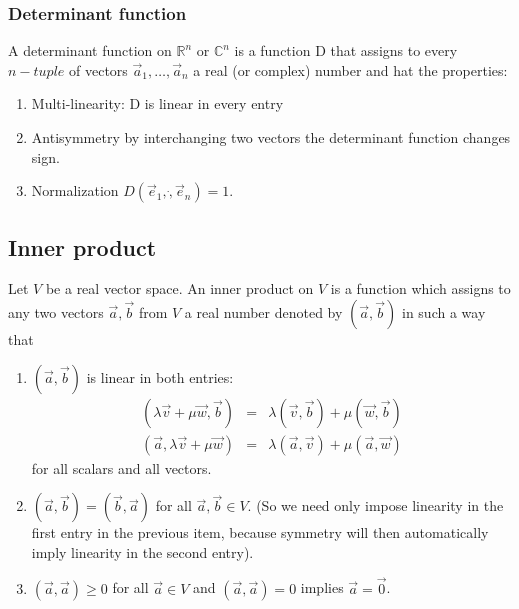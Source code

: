 \documentclass{article}
\begin{document}
			\subsubsection{Determinant function}
			A determinant function on $\mathbb{R}^n$ or $\mathbb{C}^n$ is a function D that assigns to every $n-tuple$ of vectors $\vec{a}_1,\dots,\vec{a}_n$ a real (or complex) number and hat the properties:
			\begin{enumerate}
				\item Multi-linearity: D is linear in every entry
				\item Antisymmetry by interchanging two vectors the determinant function changes sign.
				\item Normalization $D(\vec{e}_1,\dot,\vec{e}_n) = 1$.
			\end{enumerate}
		
		\subsection{Inner product}
		Let $V$ be a real vector space. An inner product on $V$ is a function which assigns to any two vectors $\vec{a},\vec{b}$ from $V$ a real number denoted by $(\vec{a},\vec{b})$ in such a way that
		\begin{enumerate}
			\item $(\vec{a}, \vec{b})$ is linear in both entries:
			\begin{eqnarray*}
				(\lambda\vec{v} + \mu\vec{w}, \vec{b}) &=& \lambda(\vec{v}, \vec{b}) + \mu(\vec{w}, \vec{b})\\
				(\vec{a}, \lambda\vec{v}+\mu\vec{w}) &=& \lambda(\vec{a}, \vec{v}) + \mu(\vec{a}, \vec{w})				
			\end{eqnarray*}
			for all scalars and all vectors.
			\item $(\vec{a}, \vec{b}) = (\vec{b}, \vec{a})$ for all $\vec{a},\vec{b} \in V$. (So we need only impose linearity in the first entry in the previous item, because symmetry will then automatically imply linearity in the second entry).
			\item $(\vec{a}, \vec{a}) \ge 0$ for all $\vec{a}\in V$ and $(\vec{a}, \vec{a}) = 0$ implies $\vec{a} = \vec{0}$.
		\end{enumerate}
\end{document}
